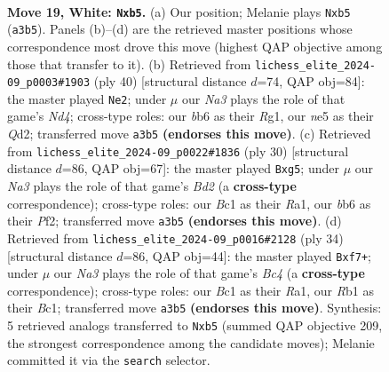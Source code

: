 \documentclass[11pt]{article}
\begin{document}
\clearpage

\begin{figure}[p]\centering
\begin{subfigure}{0.46\textwidth}\centering
\resizebox{\linewidth}{!}{%
\newchessgame
\chessboard[
  setfen={rq6/1bp2kpp/1b1p1n2/1p2n3/pP2P3/N1P5/P1Q2PPP/1RB1RK2 w - - 4 19},
  showmover=false,
  pgfstyle=straightmove, color=movearrow, markmove={a3-b5}
]}
\caption{}
\end{subfigure}\hfill
\begin{subfigure}{0.46\textwidth}\centering
\resizebox{\linewidth}{!}{%
\newchessgame
\chessboard[
  setfen={2r3k1/1bq1pp2/p2p2p1/1p5n/n2NP2P/2PB1P2/P1PQ4/K2R2R1 w - - 2 21},
  showmover=false,
  pgfstyle=straightmove, color=movearrow, markmove={d4-e2}
]}
\caption{}
\end{subfigure}
\\[4pt]
\begin{subfigure}{0.46\textwidth}\centering
\resizebox{\linewidth}{!}{%
\newchessgame
\chessboard[
  setfen={3q1r2/p4pbk/bpPpp1p1/4n1p1/2P5/2N3P1/PP1BPP1P/R1Q2RK1 w - - 1 16},
  showmover=false,
  pgfstyle=straightmove, color=movearrow, markmove={d2-g5}
]}
\caption{}
\end{subfigure}\hfill
\begin{subfigure}{0.46\textwidth}\centering
\resizebox{\linewidth}{!}{%
\newchessgame
\chessboard[
  setfen={r2q2k1/1b1n1pbp/p5p1/2p5/PpBPn3/1Q3N2/1P4PP/R1B2R1K w - - 0 18},
  showmover=false,
  pgfstyle=straightmove, color=movearrow, markmove={c4-f7}
]}
\caption{}
\end{subfigure}
\caption{\textbf{Move 19, White: \texttt{Nxb5}.} (a) Our position; Melanie plays \texttt{Nxb5} (\texttt{a3b5}). Panels (b)--(d) are the retrieved master positions whose correspondence most drove this move (highest QAP objective among those that transfer to it). (b) Retrieved from \texttt{lichess\_elite\_2024-09\_p0003\#1903} (ply 40) [structural distance $d$=74, QAP obj=84]: the master played \texttt{Ne2}; under $\mu$ our \emph{Na3} plays the role of that game's \emph{Nd4}; cross-type roles: our \emph{b}b6 as their \emph{R}g1, our \emph{n}e5 as their \emph{Q}d2; transferred move \texttt{a3b5} \textbf{(endorses this move)}. (c) Retrieved from \texttt{lichess\_elite\_2024-09\_p0022\#1836} (ply 30) [structural distance $d$=86, QAP obj=67]: the master played \texttt{Bxg5}; under $\mu$ our \emph{Na3} plays the role of that game's \emph{Bd2} (a \textbf{cross-type} correspondence); cross-type roles: our \emph{B}c1 as their \emph{R}a1, our \emph{b}b6 as their \emph{P}f2; transferred move \texttt{a3b5} \textbf{(endorses this move)}. (d) Retrieved from \texttt{lichess\_elite\_2024-09\_p0016\#2128} (ply 34) [structural distance $d$=86, QAP obj=44]: the master played \texttt{Bxf7+}; under $\mu$ our \emph{Na3} plays the role of that game's \emph{Bc4} (a \textbf{cross-type} correspondence); cross-type roles: our \emph{B}c1 as their \emph{R}a1, our \emph{R}b1 as their \emph{B}c1; transferred move \texttt{a3b5} \textbf{(endorses this move)}. Synthesis: 5 retrieved analogs transferred to \texttt{Nxb5} (summed QAP objective 209, the strongest correspondence among the candidate moves); Melanie committed it via the \texttt{search} selector.}
\label{fig:thought-m36}
\end{figure}
\end{document}
